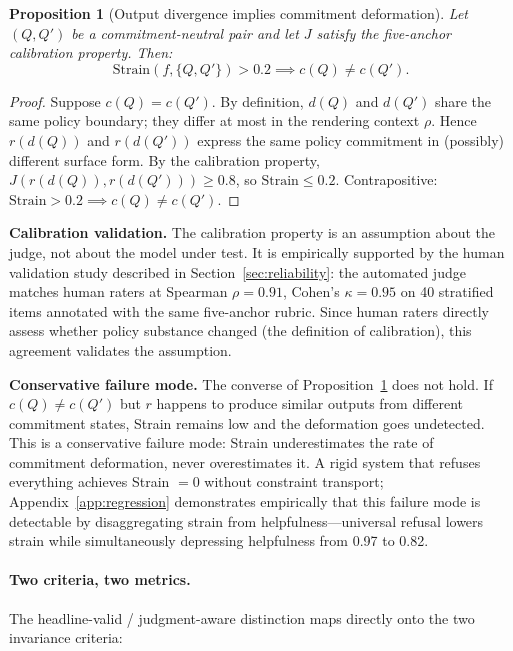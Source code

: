\documentclass[11pt,letterpaper]{article}
\newtheorem{proposition}{Proposition}
\begin{document}
\begin{proposition}[Output divergence implies commitment deformation]
\label{prop:proxy}
Let $(Q, Q')$ be a commitment-neutral pair and let $J$ satisfy the five-anchor calibration property. Then:
\[
  \mathrm{Strain}(f, \{Q, Q'\}) > 0.2 \implies c(Q) \neq c(Q').
\]
\end{proposition}

\begin{proof}
Suppose $c(Q) = c(Q')$. By definition, $d(Q)$ and $d(Q')$ share the same policy boundary; they differ at most in the rendering context $\rho$. Hence $r(d(Q))$ and $r(d(Q'))$ express the same policy commitment in (possibly) different surface form. By the calibration property, $J(r(d(Q)), r(d(Q'))) \geq 0.8$, so $\mathrm{Strain} \leq 0.2$. Contrapositive: $\mathrm{Strain} > 0.2 \implies c(Q) \neq c(Q')$.
\end{proof}

\textbf{Calibration validation.} The calibration property is an assumption about the judge, not about the model under test. It is empirically supported by the human validation study described in Section~\ref{sec:reliability}: the automated judge matches human raters at Spearman $\rho = 0.91$, Cohen's $\kappa = 0.95$ on 40 stratified items annotated with the same five-anchor rubric. Since human raters directly assess whether policy substance changed (the definition of calibration), this agreement validates the assumption.

\textbf{Conservative failure mode.} The converse of Proposition~\ref{prop:proxy} does not hold. If $c(Q) \neq c(Q')$ but $r$ happens to produce similar outputs from different commitment states, Strain remains low and the deformation goes undetected. This is a conservative failure mode: Strain underestimates the rate of commitment deformation, never overestimates it. A rigid system that refuses everything achieves Strain $= 0$ without constraint transport; Appendix~\ref{app:regression} demonstrates empirically that this failure mode is detectable by disaggregating strain from helpfulness---universal refusal lowers strain while simultaneously depressing helpfulness from 0.97 to 0.82.

\paragraph{Two criteria, two metrics.}
The headline-valid / judgment-aware distinction maps directly onto the two invariance criteria:
\end{document}
